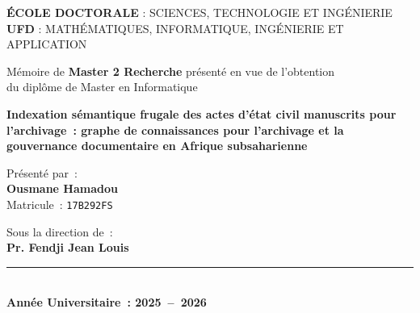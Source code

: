 \documentclass[12pt,a4paper]{report}
\newcommand{\titreMemoire}{Indexation s\'emantique frugale des actes d'\'etat civil manuscrits pour l'archivage~: graphe de connaissances pour l'archivage et la gouvernance documentaire en Afrique subsaharienne}
\newcommand{\auteurNom}{Ousmane Hamadou}
\newcommand{\matriculeEtu}{17B292FS}
\newcommand{\directeurNom}{Pr. Fendji Jean Louis}
\newcommand{\anneeUniv}{2025~--~2026}
\begin{document}
\begin{titlepage}
    \vspace{0.7cm}

    {\small
        \textbf{\'ECOLE DOCTORALE} : SCIENCES, TECHNOLOGIE ET ING\'ENIERIE\\[3pt]
        \textbf{UFD} : MATH\'EMATIQUES, INFORMATIQUE, ING\'ENIERIE ET APPLICATION
    }

    \vspace{0.55cm}

    {\normalsize
        M\'emoire de \textbf{Master 2 Recherche} pr\'esent\'e en vue de l'obtention\\
        du dipl\^ome de Master en Informatique
    }

    \vspace{1.15cm}

    \begin{tcolorbox}[
            colback=white,
            colframe=accentcolor,
            boxrule=1pt,
            arc=0pt,
            sharp corners,
            borderline={0.4pt}{2pt}{accentcolor},
            left=12pt, right=12pt, top=14pt, bottom=14pt,
            width=0.90\textwidth,
            halign=center,
            valign=center,
        ]
        {\bfseries\Large \titreMemoire}
    \end{tcolorbox}

    \vspace{1.2cm}

    {\large Pr\'esent\'e par~:}\\[3pt]
    {\Large\bfseries \auteurNom}\\[3pt]
    Matricule~: \texttt{\matriculeEtu}

    \vspace{0.75cm}

    {\large Sous la direction de~:}\\[3pt]
    {\large\bfseries \directeurNom}

    \vfill

    \textcolor{accentcolor}{\rule{0.5\linewidth}{0.4pt}}\\[8pt]
    {\large\bfseries Ann\'ee Universitaire~: \anneeUniv}\\[4pt]

\end{titlepage}
\end{document}
